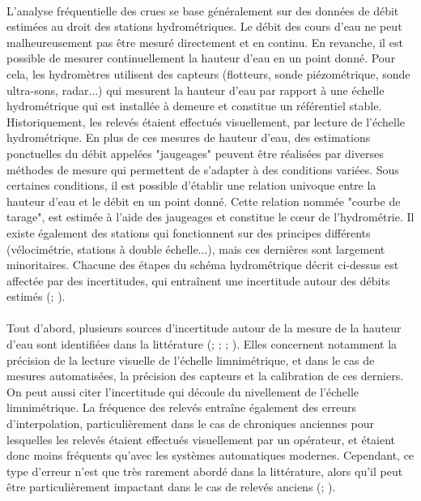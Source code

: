 	\paragraph{} L'analyse fréquentielle des crues se base généralement sur des données de débit estimées au droit des stations hydrométriques. Le débit des cours d'eau ne peut malheureusement pas être mesuré directement et en continu. En revanche, il est possible de mesurer continuellement la hauteur d'eau en un point donné. Pour cela, les hydromètres utilisent des capteurs (flotteurs, sonde piézométrique, sonde ultra-sons, radar...) qui mesurent la hauteur d'eau par rapport à une échelle hydrométrique qui est installée à demeure et constitue un référentiel stable. Historiquement, les relevés étaient effectués visuellement, par lecture de l'échelle hydrométrique. En plus de ces mesures de hauteur d'eau, des estimations ponctuelles du débit appelées "jaugeages" peuvent être réalisées par diverses méthodes de mesure qui permettent de s'adapter à des conditions variées. Sous certaines conditions, il est possible d'établir une relation univoque entre la hauteur d'eau et le débit en un point donné. Cette relation nommée "courbe de tarage", est estimée à l'aide des jaugeages et constitue le cœur de l'hydrométrie. Il existe également des stations qui fonctionnent sur des principes différents (vélocimétrie, stations à double échelle...), mais ces dernières sont largement minoritaires. Chacune des étapes du schéma hydrométrique décrit ci-dessus est affectée par des incertitudes, qui entraînent une incertitude autour des débits estimés (\cite{mcmillan_benchmarking_2012}; \cite{puechberty_charte_2017}). 
	
	\paragraph{} Tout d'abord, plusieurs sources d'incertitude autour de la mesure de la hauteur d'eau sont identifiées dans la littérature (\cite{van_der_made_determination_1982}; \cite{petersen-overleir_uncertainty_2005}; \cite{mcmillan_benchmarking_2012}; \cite{horner_impact_2018}). Elles concernent notamment la précision de la lecture visuelle de l'échelle limnimétrique, et dans le cas de mesures automatisées, la précision des capteurs et la calibration de ces derniers. On peut aussi citer l'incertitude qui découle du nivellement de l'échelle limnimétrique. La fréquence des relevés entraîne également des erreurs d'interpolation, particulièrement dans le cas de chroniques anciennes pour lesquelles les relevés étaient effectués visuellement par un opérateur, et étaient donc moins fréquents qu'avec les systèmes automatiques modernes. Cependant, ce type d'erreur n'est que très rarement abordé dans la littérature, alors qu'il peut être particulièrement impactant dans le cas de relevés anciens (\cite{hamilton_quantifying_2012}; \cite{kuentz_hydrometrie_2014}).
	
